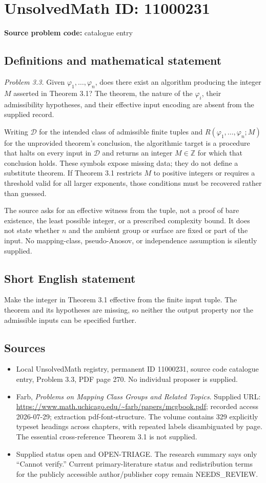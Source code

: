 \documentclass[11pt]{article}
\newcommand{\Z}{\mathbb{Z}}
\begin{document}
\section*{UnsolvedMath ID: 11000231}
\textbf{Source problem code:} catalogue entry
\subsection{Definitions and mathematical statement}
\emph{Problem 3.3.} Given \(\varphi_1,\ldots,\varphi_n\), does there exist an algorithm producing the integer \(M\) asserted in Theorem 3.1? The theorem, the nature of the \(\varphi_i\), their admissibility hypotheses, and their effective input encoding are absent from the supplied record.

Writing \(\mathcal D\) for the intended class of admissible finite tuples and \(R(\varphi_1,\ldots,\varphi_n;M)\) for the unprovided theorem's conclusion, the algorithmic target is a procedure that halts on every input in \(\mathcal D\) and returns an integer \(M\in\Z\) for which that conclusion holds. These symbols expose missing data; they do not define a substitute theorem. If Theorem 3.1 restricts \(M\) to positive integers or requires a threshold valid for all larger exponents, those conditions must be recovered rather than guessed.

The source asks for an effective witness from the tuple, not a proof of bare existence, the least possible integer, or a prescribed complexity bound. It does not state whether \(n\) and the ambient group or surface are fixed or part of the input. No mapping-class, pseudo-Anosov, or independence assumption is silently supplied.
\subsection{Short English statement}
Make the integer in Theorem 3.1 effective from the finite input tuple. The theorem and its hypotheses are missing, so neither the output property nor the admissible inputs can be specified further.
\subsection{Sources}
\begin{itemize}
\item Local UnsolvedMath registry, permanent ID 11000231, source code catalogue entry, Problem 3.3, PDF page 270. No individual proposer is supplied.
\item Farb, \emph{Problems on Mapping Class Groups and Related Topics}. Supplied URL: \url{https://www.math.uchicago.edu/~farb/papers/mcgbook.pdf}; recorded access 2026-07-29; extraction pdf-font-structure. The volume contains 329 explicitly typeset headings across chapters, with repeated labels disambiguated by page. The essential cross-reference Theorem 3.1 is not supplied.
\item Supplied status open and OPEN-TRIAGE. The research summary says only ``Cannot verify.'' Current primary-literature status and redistribution terms for the publicly accessible author/publisher copy remain NEEDS\_REVIEW.
\end{itemize}
\end{document}
